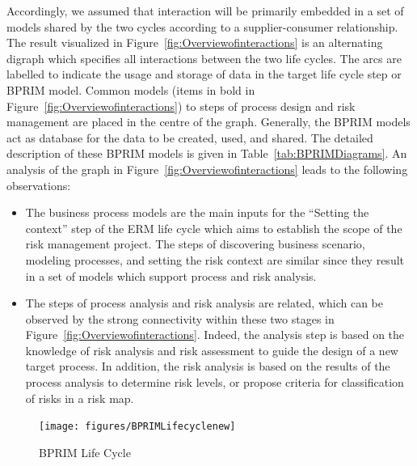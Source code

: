 \documentclass[preprint,3p,times,number]{elsarticle}
\begin{document}

Accordingly, we assumed that interaction will be primarily embedded in a set of models shared by the two cycles according to a supplier-consumer relationship. The result visualized in Figure~\ref{fig:Overviewofinteractions} is an alternating digraph which specifies all interactions between the two life cycles. The arcs are labelled to indicate the usage and storage of data in the target life cycle step or BPRIM model. Common models (items in bold in Figure~\ref{fig:Overviewofinteractions}) to steps of process design and risk management are placed in the centre of the graph. Generally, the BPRIM models act as database for the data to be created, used, and shared. The detailed description of these BPRIM models is given in Table~\ref{tab:BPRIMDiagrams}. An analysis of the graph in Figure~\ref{fig:Overviewofinteractions} leads to the following observations:
\begin{itemize}
    \item 
    The business process models are the main inputs for the \enquote{Setting the context} step of the ERM life cycle which aims to establish the scope of the risk management project. The steps of discovering business scenario, modeling processes, and setting the risk context are similar since they result in a set of models which support process and risk analysis.
    \item The steps of process analysis and risk analysis are related, which can be observed by the strong connectivity within these two stages in Figure~\ref{fig:Overviewofinteractions}. Indeed, the analysis step is based on the knowledge of risk analysis and risk assessment to guide the design of a new target process. In addition, the risk analysis is based on the results of the process analysis to determine risk levels, or propose criteria for classification of risks in a risk map.
\end{itemize}

\begin{figure}[t]
 \begin{center}
    \texttt{[image: figures/BPRIMLifecyclenew]}
    \caption{BPRIM Life Cycle}
    \label{fig:BPRIMLifecycle}
 \end{center}
\end{figure}
\end{document}

